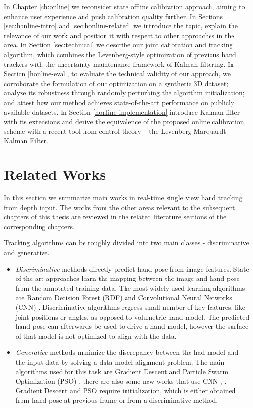 In Chapter \ref{ch:online} we reconsider state offline calibration approach, aiming to enhance user experience and push calibration quality further. In Sections \ref{sec:honline-intro} and \ref{sec:honline-related} we introduce the topic, explain the relevance of our work and position it with respect to other approaches in the area. In Section \ref{sec:technical} we describe our joint calibration and tracking algorithm, which combines the Levenberg-style optimization of previous hand trackers with the uncertainty maintenance framework of Kalman filtering. In Section \ref{honline-eval}, to evaluate the technical validity of our approach, we corroborate the formulation of our optimization on a synthetic 3D dataset; analyze its robustness through randomly perturbing the algorithm initialization; and attest how our method achieves state-of-the-art performance on publicly available datasets. In Section \ref{honline-implementation} introduce Kalman filter with its extensions and derive the equivalence of the proposed online calibration scheme with a recent tool from control theory – the Levenberg-Marquardt Kalman Filter.

\section{Related Works}

In this section we summarize main works in real-time single view hand tracking from depth input. The works from the other areas relevant to the subsequent chapters of this thesis are reviewed in the related literature sections of the corresponding chapters. 

Tracking algorithms can be roughly divided into two main classes - discriminative and generative.
\vspace{-1.5em}
\begin{itemize}
\item \textit{Discriminative} methods directly predict hand pose from image features. State of the art approaches learn the mapping between the image and hand pose from the annotated training data. The most widely used learning algorithms are Random Decision Forest (RDF) \cite{keskin2012hand} and Convolutional Neural Networks (CNN) \cite{tompson2014real}. Discriminative algorithms regress small number of key features, like joint positions or angles, as opposed to volumetric hand model. The predicted hand pose can afterwards be used to drive a hand model, however the surface of that model is not optimized to align with the data. 
%
\item \textit{Generative} methods minimize the discrepancy between the had model and the input data by solving a data-model alignment problem. The main algorithms used for this task are Gradient Descent \cite{taylor2016concerto} and Particle Swarm Optimization (PSO) \cite{oiko2011hand}, there are also some new works that use CNN \cite{simon2017hand}, \cite{zimmermann2017learning}. Gradient Descent and PSO require initialization, which is either obtained from hand pose at previous frame or from a discriminative method.
\end{itemize}

